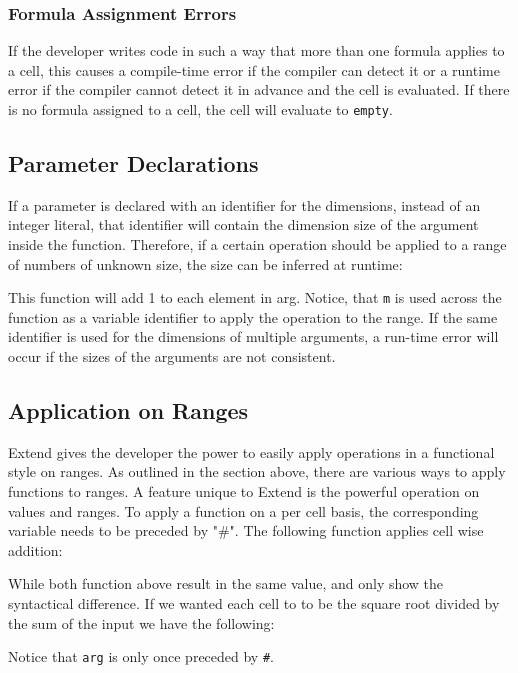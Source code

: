 \subsubsection{Formula Assignment Errors}
If the developer writes code in such a way that more than one formula applies to a cell, this causes a compile-time error if the compiler can detect it or a runtime error if the compiler cannot detect it in advance and the cell is evaluated. If there is no formula assigned to a cell, the cell will evaluate to \texttt{empty}.
\subsection{Parameter Declarations}
If a parameter is declared with an identifier for the dimensions, instead of an integer literal, that identifier will contain the dimension size of the argument inside the function. Therefore, if a certain operation should be applied to a range of numbers of unknown size, the size can be inferred at runtime:

This function will add 1 to each element in arg. Notice, that \texttt{m} is used across the function as a variable identifier to apply the operation to the range. If the same identifier is used for the dimensions of multiple arguments, a run-time error will occur if the sizes of the arguments are not consistent. 
\subsection{Application on Ranges}
Extend gives the developer the power to easily apply operations in a functional style on ranges. As outlined in the section above, there are various ways to apply functions to ranges. A feature unique to Extend is the powerful operation on values and ranges. To apply a function on a per cell basis, the corresponding variable needs to be preceded by "\#". The following function applies cell wise addition:

While both function above result in the same value, and only show the syntactical difference. If we wanted each cell to to be the square root divided by the sum of the input we have the following:

Notice that \texttt{arg} is only once preceded by \texttt{\#}.

